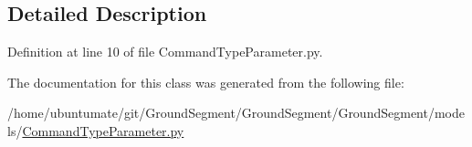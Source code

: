 \subsection{Detailed Description}


Definition at line 10 of file Command\+Type\+Parameter.\+py.



The documentation for this class was generated from the following file\+:\begin{DoxyCompactItemize}
\item 
/home/ubuntumate/git/\+Ground\+Segment/\+Ground\+Segment/\+Ground\+Segment/models/\hyperlink{_command_type_parameter_8py}{Command\+Type\+Parameter.\+py}\end{DoxyCompactItemize}
